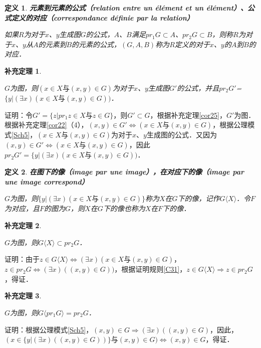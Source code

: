 \documentclass[12pt, a4paper, oneside]{book}
\newtheorem{cor}{补充定理}
\newtheorem{de}{定义}
\begin{document}
			\begin{de}
				\textbf{元素到元素的公式（relation entre un élément et un élément）、公式定义的对应（correspondance définie par la relation）}
				\par
				如果$R$为对于$x$、$y$生成图$G$的公式，$A$、$B$满足$pr_1G\subset A$、$pr_2G\subset B$，则称$R$为对于$x$、$y$从$A$的元素到$B$的元素的公式，$(G, A, B)$称为$R$定义的对于$x$、$y$的$A$到$B$的对应．
			\end{de}
			
			\begin{cor}\label{cor33}
				\hfill\par
				$G$为图，则$(x\in X\text{与}(x, y)\in G)$为对于$x$、$y$生成图$G'$的公式，并且$pr_2G'$=$\{y|(\exists x) (x\in X\text{与}(x, y)\in G))$．
			\end{cor}
			证明：令$G'=\{z|pr_1z\in X\text{与}z\in G\}$，则$G'\subset G$，根据补充定理\ref{cor25}，$G'$为图．根据补充定理\ref{cor22}（4），$(x, y)\in G'\Leftrightarrow (x\in X\text{与}(x, y)\in G)$，根据公理模式\ref{Sch5}，$(x\in X\text{与}(x, y)\in G)$为对于$x$、$y$生成图的公式．又因为$(x, y)\in G'\Leftrightarrow (x\in X\text{与}(x, y)\in G)$，因此$pr_2G'=\{y|(\exists x) (x\in X\text{与}(x, y)\in G))$．
			
			\begin{de}
				\textbf{在图下的像（image par une image），在对应下的像（image par une image correspond）}
				\par
				$G$为图，则$\{y|(\exists x)(x\in X\text{与}(x, y)\in G)\}$称为$X$在$G$下的像，记作$G\langle X\rangle$．令$F$为对应，且$F$的图为$G$，则$X$在$G$下的像也称为$X$在$F$下的像．
			\end{de}
			
			\begin{cor}\label{cor34}
				\hfill\par
				$G$为图，则$G\langle X \rangle \subset pr_2G$．
			\end{cor}
			证明：由于$z\in G\langle X \rangle \Leftrightarrow (\exists x)(x\in X\text{与}(x, y)\in G)$，$z\in pr_2G\Leftrightarrow (\exists x)((x, y)\in G))$，根据证明规则\ref{C31}，$z\in G\langle X \rangle \Rightarrow z\in pr_2G$，得证．
			
			\begin{cor}\label{cor35}
				\hfill\par
				$G$为图，则$G\langle pr_1G\rangle=pr_2G$．
			\end{cor}
			证明：根据公理模式\ref{Sch5}，$(x, y)\in G\Rightarrow (\exists x)((x, y)\in G)$，因此，$(x\in \{y|(\exists x)((x, y)\in G))\}\text{与}(x, y)\in G)\Leftrightarrow (x, y)\in G$，得证．				
			
\end{document}
